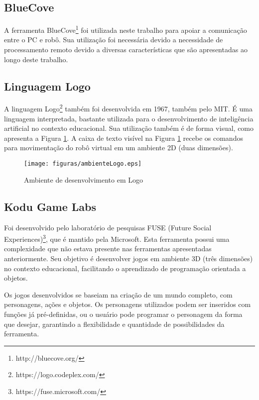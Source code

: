 
	\subsection{BlueCove} %
	\label{sub:bluecove}	
		
		A ferramenta BlueCove\footnote{http://bluecove.org/} foi utilizada neste trabalho para apoiar a comunicação entre o PC e robô. Sua utilização foi necessária devido a necessidade de processamento remoto devido a diversas características que são apresentadas ao longo deste trabalho.

	\subsection{Linguagem Logo} %
	\label{sub:linguagem_logo}

		A linguagem Logo\footnote{https://logo.codeplex.com/} também foi desenvolvida em 1967, também pelo MIT. É uma linguagem interpretada, bastante utilizada para o desenvolvimento de inteligência artificial no contexto educacional. Sua utilização também é de forma visual, como apresenta a Figura \ref{img:ambienteLogo}. A caixa de texto visível na Figura \ref{img:ambienteLogo} recebe os comandos para movimentação do robô virtual em um ambiente 2D (duas dimensões).

		\begin{figure}[H]
			\centering
			\texttt{[image: figuras/ambienteLogo.eps]}
			\caption[Ambiente de desenvolvimento em Logo]{Ambiente de desenvolvimento em Logo}
			\label{img:ambienteLogo}
		\end{figure}

	\subsection{Kodu Game Labs} %
	\label{sub:kodu_game_labs}

		Foi desenvolvido pelo laboratório de pesquisas FUSE (Future Social Experiences)\footnote{https://fuse.microsoft.com/}, que é mantido pela Microsoft. Esta ferramenta possui uma complexidade que não estava presente nas ferramentas apresentadas anteriormente. Seu objetivo é desenvolver jogos em ambiente 3D (três dimensões) no contexto educacional, facilitando o aprendizado de programação orientada a objetos. 

		Os jogos desenvolvidos se baseiam na criação de um mundo completo, com personagens, ações e objetos. Os personagens utilizados podem ser inseridos com funções já pré-definidas, ou o usuário pode programar o personagem da forma que desejar, garantindo a flexibilidade e quantidade de possibilidades da ferramenta.
	
